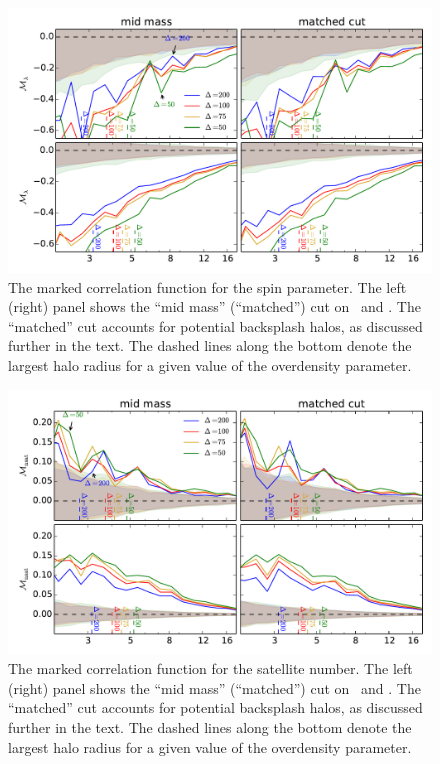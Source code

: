 \documentclass[usenatbib,usegraphicx,letterpaper]{mn2e}
\begin{document}
\begin{figure}
	\centering
	\includegraphics[width=.9\textwidth]{all_mcf_spin_z00_hostsvmatch.pdf}
	\caption{The marked correlation function for the spin parameter. The left (right) panel shows the ``mid mass'' (``matched'') cut on \simA \ and \simB. The ``matched'' cut accounts for potential backsplash halos, as discussed further in the text. The dashed lines along the bottom denote the largest halo radius for a given value of the overdensity parameter.}
	\label{fig:hvm_mcf_spin}
\end{figure}

\begin{figure}
	\centering
	\includegraphics[width=.9\textwidth]{all_mcf_nsat_z00_hostsvmatch.pdf}
	\caption{The marked correlation function for the satellite number. The left (right) panel shows the ``mid mass'' (``matched'') cut on \simA \ and \simB. The ``matched'' cut accounts for potential backsplash halos, as discussed further in the text. The dashed lines along the bottom denote the largest halo radius for a given value of the overdensity parameter.}
	\label{fig:hvm_mcf_nsat}
\end{figure}
\end{document}
